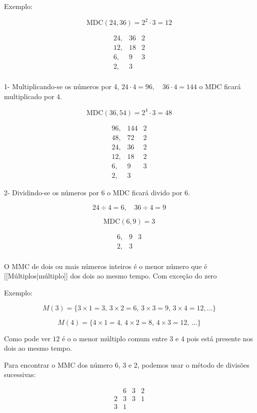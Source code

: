 \documentclass[letterpaper]{book}
\begin{document}
Exemplo:

\[\text{MDC} (24,36) = 2^{2} \cdot 3 = 12\]

\[
\begin{array}{cc|cc}
24, & 36 & 2 \\
12, & 18 & 2 \\
6,  &  9 & 3 \\  
2,  &  3 &  \\
\end{array}
\]

1- Multiplicando-se os números por 4, \(24 \cdot 4 = 96, \quad 36 \cdot 4 = 144\) o MDC ficará multiplicado por 4.

\[\text{MDC} (36,54) = 2^{4} \cdot 3= 48\]

\[
\begin{array}{cc|cc}
96, & 144  & 2 \\
48, & 72   & 2 \\
24, & 36   & 2 \\  
12, & 18   & 2 \\
6,  &  9   & 3 \\
2,  &  3
\end{array}
\]

2- Dividindo-se os números por 6 o MDC ficará divido por 6.

\[24 \div 4 = 6, \quad 36 \div 4 = 9\]

\[\text{MDC}(6,9) = 3\]

\[
\begin{array}{cc|cc}
6, & 9 & 3 \\
2, & 3 & \\
\end{array}
\]

O MMC de dois ou mais números inteiros é o menor número que é [[Múltiplos|múltiplo]] dos dois ao mesmo tempo. Com exceção do zero

Exemplo:


\[M(3) = \{3 \times 1 = 3,\, 3 \times 2 = 6,\, 3 \times 3 = 9,\, 3 \times 4 = 12, \ldots\}\]

\[M(4) = \{4 \times 1 = 4,\, 4 \times 2 = 8,\, 4 \times 3 = 12,\,\ldots\}\]

Como pode ver \(12\) é o o menor múltiplo comum entre \(3\) e \(4\) pois está presente nos dois ao mesmo tempo.

Para encontrar o MMC dos número 6, 3 e 2, podemos usar o método de divisões sucessivas:

\[
\begin{array}{c|ccc}
& 6 & 3 & 2 \\
\hline
2 & 3 & 3 & 1 \\
3 & 1 & & \\
\end{array}
\]
\end{document}
